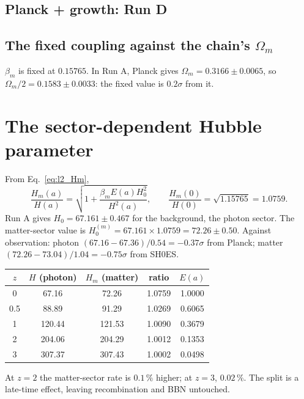 \subsection{Planck + growth: Run D}
\subsection{The fixed coupling against the chain's $\Omega_m$}
$\beta_m$ is fixed at $0.15765$. In Run A, Planck gives $\Omega_m=0.3166\pm0.0065$, so $\Omega_m/2=0.1583\pm0.0033$: the fixed value is $0.2\sigma$ from it.

\section{The sector-dependent Hubble parameter}
From Eq.~\eqref{eq:l2_Hm},
\begin{equation}
\frac{H_m(a)}{H(a)}=\sqrt{1+\frac{\beta_mE(a)H_0^2}{H^2(a)}},\qquad\frac{H_m(0)}{H(0)}=\sqrt{1.15765}=1.0759 .
\end{equation}
Run A gives $H_0=67.161\pm0.467$ for the background, the photon sector. The matter-sector value is $H_0^{(m)}=67.161\times1.0759=72.26\pm0.50$.
Against observation: photon $(67.16-67.36)/0.54=-0.37\sigma$ from Planck; matter $(72.26-73.04)/1.04=-0.75\sigma$ from SH0ES.
\begin{center}\small
\begin{tabular}{ccccc}\hline
$z$ & $H$ (photon) & $H_m$ (matter) & ratio & $E(a)$\\\hline
0 & 67.16 & 72.26 & 1.0759 & 1.0000\\
0.5 & 88.89 & 91.29 & 1.0269 & 0.6065\\
1 & 120.44 & 121.53 & 1.0090 & 0.3679\\
2 & 204.06 & 204.29 & 1.0012 & 0.1353\\
3 & 307.37 & 307.43 & 1.0002 & 0.0498\\\hline
\end{tabular}
\end{center}
At $z=2$ the matter-sector rate is $0.1\,\%$ higher; at $z=3$, $0.02\,\%$. The split is a late-time effect, leaving recombination and BBN untouched.

